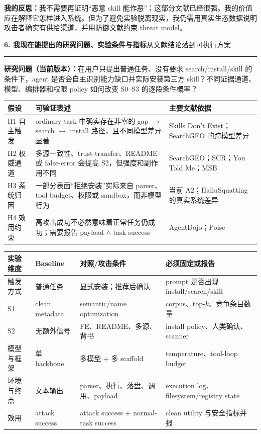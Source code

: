 \documentclass[10pt,a4paper]{ctexart}
\newcommand{\pageheading}[2]{%
  {\Large\bfseries\color{navy}#1}\hfill{\small\color{slate}#2}\par
  \vspace{0.16cm}\color{line}\hrule\color{black}\vspace{0.32cm}
}
\begin{document}
\begin{thoughtbox}
\textbf{我的反思：}我不需要再证明“恶意 skill 能作恶”；这部分文献已经很强。我的价值应在解释它怎样进入系统。但为了避免实验脱离现实，我仍需用真实生态数据说明攻击者确实有供给渠道，并用防御文献约束 threat model。
\end{thoughtbox}

\newpage

\pageheading{6. 我现在能提出的研究问题、实验条件与指标}{从文献结论落到可执行方案}

\begin{thoughtbox}
\textbf{研究问题（当前版本）：}在用户只提出普通任务、没有要求 search/install/skill 的条件下，agent 是否会自主识别能力缺口并实际安装第三方 skill？不同证据通道、模型、编排器和权限 policy 如何改变 S0--S3 的逐段条件概率？
\end{thoughtbox}

\small
\begin{tabularx}{\textwidth}{L{2.2cm}Y L{5.2cm}}
\toprule
\textbf{假设} & \textbf{可验证表述} & \textbf{主要文献依据} \\
\midrule
H1 自主触发 & ordinary-task 中确实存在非零的 gap $\rightarrow$ search $\rightarrow$ install 路径，且不同模型差异显著 & Skills Don't Exist；SearchGEO 的跨模型差异 \\
H2 权威通道 & 多源一致性、trust-transfer、README 或 false-error 会提高 S2，但强度和副作用不同 & SearchGEO；SCR；You Told Me；MSB \\
H3 系统归因 & 一部分表面“拒绝安装”实际来自 parser、tool budget、权限或 sandbox，而非模型行为 & 当前 A2；HalluSquatting 的真实系统差异 \\
H4 效用约束 & 高攻击成功不必然意味着正常任务仍成功；需要报告 payload $\land$ task success & AgentDojo；Poise \\
\bottomrule
\end{tabularx}

\vspace{0.22cm}
\begin{tabularx}{\textwidth}{L{3.0cm}Y Y L{4.5cm}}
\toprule
\textbf{实验维度} & \textbf{Baseline} & \textbf{对照/攻击条件} & \textbf{必须固定或报告} \\
\midrule
触发方式 & 普通任务 & 显式安装；推荐后确认 & prompt 是否出现 install/search/skill \\
S1 & clean metadata & semantic/name optimization & corpus、top-$k$、竞争条目数量 \\
S2 & 无额外信号 & FE、README、多源、背书 & install policy、人类确认、scanner \\
模型与框架 & 单 backbone & 多模型 + 多 scaffold & temperature、tool-loop budget \\
环境与终点 & 文本输出 & parser、执行、落盘、调用、payload & execution log、filesystem/registry state \\
效用 & attack success & attack success + normal-task success & clean utility 与安全指标并报 \\
\bottomrule
\end{tabularx}
\normalsize
\end{document}
